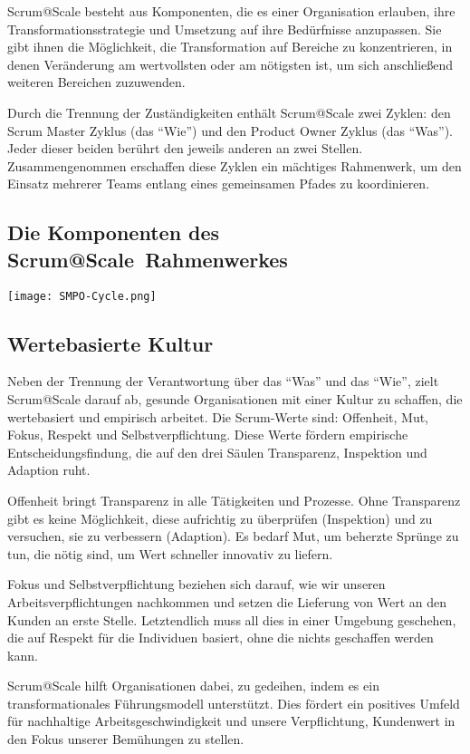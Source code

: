 \documentclass[12pt,a4paper,parskip=full]{scrartcl}
\begin{document}
Scrum@Scale besteht aus Komponenten, die es einer Organisation erlauben, ihre
Transformationsstrategie und Umsetzung auf ihre Bedürfnisse anzupassen. Sie gibt
ihnen die Möglichkeit, die Transformation auf Bereiche zu konzentrieren, in
denen Veränderung am wertvollsten oder am nötigsten ist, um sich anschließend
weiteren Bereichen zuzuwenden.

Durch die Trennung der Zuständigkeiten enthält Scrum@Scale zwei Zyklen: den
Scrum Master Zyklus (das ``Wie'') und den Product Owner Zyklus (das ``Was'').
Jeder dieser beiden berührt den jeweils anderen an zwei Stellen. Zusammengenommen
erschaffen diese Zyklen ein mächtiges Rahmenwerk, um den Einsatz mehrerer Teams
entlang eines gemeinsamen Pfades zu koordinieren.

\subsection{Die Komponenten des Scrum@Scale\textregistered ~Rahmenwerkes}

\texttt{[image: SMPO-Cycle.png]}

\subsection{Wertebasierte Kultur}
Neben der Trennung der Verantwortung über das ``Was'' und das ``Wie'', zielt
Scrum@Scale darauf ab, gesunde Organisationen mit einer Kultur zu schaffen, die
wertebasiert und empirisch arbeitet. Die Scrum-Werte sind:
Offenheit, Mut, Fokus, Respekt und Selbstverpflichtung. Diese Werte fördern
empirische Entscheidungsfindung, die auf den drei Säulen
Transparenz, Inspektion und Adaption ruht.

Offenheit bringt Transparenz in alle Tätigkeiten und Prozesse. Ohne Transparenz
gibt es keine Möglichkeit, diese aufrichtig zu überprüfen (Inspektion) und zu
versuchen, sie zu verbessern (Adaption). Es bedarf Mut, um beherzte Sprünge zu
tun, die nötig sind, um Wert schneller innovativ zu liefern.

Fokus und Selbstverpflichtung beziehen sich darauf, wie wir unseren
Arbeitsverpflichtungen nachkommen und setzen die Lieferung von Wert an den
Kunden an erste Stelle. Letztendlich muss all dies in einer Umgebung
geschehen, die auf Respekt für die Individuen basiert, ohne die nichts
geschaffen werden kann.

Scrum@Scale hilft Organisationen dabei, zu gedeihen, indem es ein
transformationales Führungsmodell unterstützt. Dies fördert ein positives
Umfeld für nachhaltige Arbeitsgeschwindigkeit und unsere Verpflichtung,
Kundenwert in den Fokus unserer Bemühungen zu stellen.
\end{document}
